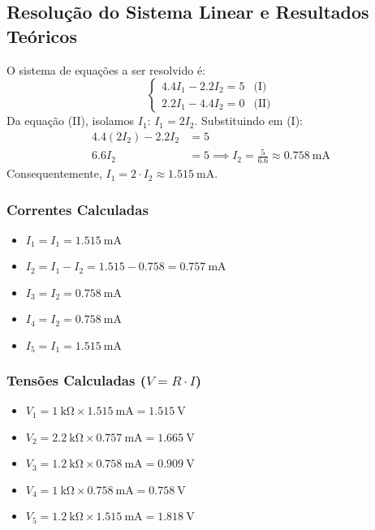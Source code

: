 \documentclass[a4paper, 12pt]{article}
\begin{document}
\subsection{Resolução do Sistema Linear e Resultados Teóricos}
O sistema de equações a ser resolvido é:
\begin{equation}
\begin{cases}
4.4 I_1 - 2.2 I_2 = 5 & \text{(I)} \\
2.2 I_1 - 4.4 I_2 = 0 & \text{(II)}
\end{cases}
\end{equation}
Da equação (II), isolamos $I_1$: $I_1 = 2 I_2$. Substituindo em (I):
\begin{align*}
4.4 (2 I_2) - 2.2 I_2 &= 5 \\
6.6 I_2 &= 5 \implies I_2 = \frac{5}{6.6} \approx \SI{0.758}{\milli\ampere}
\end{align*}
Consequentemente, $I_1 = 2 \cdot I_2 \approx \SI{1.515}{\milli\ampere}$.

\subsubsection*{Correntes Calculadas}
\begin{itemize}
\item $I_{1} = I_1 = \SI{1.515}{\milli\ampere}$
\item $I_{2} = I_1 - I_2 = 1.515 - 0.758 = \SI{0.757}{\milli\ampere}$
\item $I_{3} = I_2 = \SI{0.758}{\milli\ampere}$
\item $I_{4} = I_2 = \SI{0.758}{\milli\ampere}$
\item $I_{5} = I_1 = \SI{1.515}{\milli\ampere}$
\end{itemize}

\subsubsection*{Tensões Calculadas ($V = R \cdot I$)}
\begin{itemize}
\item $V_{1} = \SI{1}{\kilo\ohm} \times \SI{1.515}{\milli\ampere} = \SI{1.515}{\volt}$
\item $V_{2} = \SI{2.2}{\kilo\ohm} \times \SI{0.757}{\milli\ampere} = \SI{1.665}{\volt}$
\item $V_{3} = \SI{1.2}{\kilo\ohm} \times \SI{0.758}{\milli\ampere} = \SI{0.909}{\volt}$
\item $V_{4} = \SI{1}{\kilo\ohm} \times \SI{0.758}{\milli\ampere} = \SI{0.758}{\volt}$
\item $V_{5} = \SI{1.2}{\kilo\ohm} \times \SI{1.515}{\milli\ampere} = \SI{1.818}{\volt}$
\end{itemize}
\end{document}
